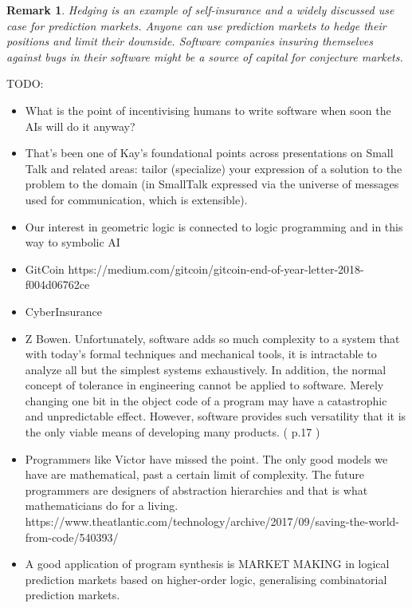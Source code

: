\documentclass[english,letter paper,12pt,reqno]{article}
\theoremstyle{example}
\newtheorem{example}[theorem]{Example}
\newtheorem{remark}[theorem]{Remark}
\begin{document}

\begin{remark} Hedging is an example of self-insurance and a widely discussed use case for prediction markets. Anyone can use prediction markets to hedge their positions and limit their downside. Software companies insuring themselves against bugs in their software might be a source of capital for conjecture markets.
\end{remark}

TODO:
\begin{itemize}
\item What is the point of incentivising humans to write software when soon the AIs will do it anyway?
\item That's been one of Kay's foundational points across presentations on Small Talk and related areas: tailor (specialize) your expression of a solution to the problem to the domain (in SmallTalk expressed via the universe of messages used for communication, which is extensible).
\item Our interest in geometric logic is connected to logic programming and in this way to symbolic AI
\item GitCoin https://medium.com/gitcoin/gitcoin-end-of-year-letter-2018-f004d06762ce
\item CyberInsurance
\item Z Bowen. Unfortunately, software adds so much complexity to a system that with today's formal techniques and mechanical tools, it is intractable to analyze all but the simplest systems exhaustively. In addition, the normal concept of tolerance in engineering cannot be applied to software. Merely changing one bit in the object code of a program may have a catastrophic and unpredictable effect. However, software provides such versatility that it is the only viable means of developing many products. ( p.17 )
\item Programmers like Victor have missed the point. The only good models we have are mathematical, past a certain limit of complexity. The future programmers are designers of abstraction hierarchies and that is what mathematicians do for a living. https://www.theatlantic.com/technology/archive/2017/09/saving-the-world-from-code/540393/
\item A good application of program synthesis is MARKET MAKING in logical prediction markets based on higher-order logic, generalising combinatorial prediction markets.
\end{itemize}
\end{document}
